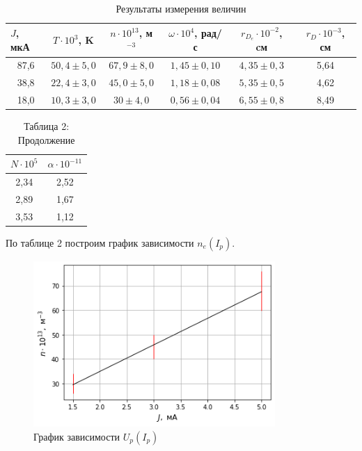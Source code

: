 \documentclass[a4paper]{article}
\theoremstyle{definition}
\theoremstyle{remark}
\begin{document}
        \begin{table}[h!]
            \centering
            \caption{Результаты измерения величин}
            \begin{tabular}{|c|c|c|c|c|c|}
            \hline
            \multicolumn{1}{|l|}{$J$, мкА} & $T\cdot 10^3$, K & $n \cdot 10^13$, м$^{-3}$ & $\omega \cdot 10^4$, рад/с & $r_{D_{e}}\cdot 10^{-2}$, cм & $r_{D} \cdot 10^{-3}$, см \\ \hline
            87,6                           & $50,4 \pm 5,0$   & $67,9 \pm 8,0$            & $1,45 \pm 0,10$            & $4,35 \pm 0,3$               & 5,64                      \\ \hline
            38,8                           & $22,4 \pm 3,0$   & $45,0 \pm 5,0$            & $1,18 \pm 0,08$            & $5,35 \pm 0,5$               & 4,62                      \\ \hline
            18,0                           & $10,3 \pm 3,0$   & $30 \pm 4,0$              & $0,56 \pm 0,04$            & $6,55 \pm 0,8$               & 8,49                      \\ \hline
            \end{tabular}
            \end{table}

            \newpage

            \begin{table}[t!]
                \centering
                \caption*{Таблица 2: Продолжение}
                \begin{tabular}{|c|c|}
                \hline
                $N \cdot 10^5$ & $\alpha \cdot 10^{-11}$ \\ \hline
                2,34           & 2,52                    \\ \hline
                2,89           & 1,67                    \\ \hline
                3,53           & 1,12                    \\ \hline
                \end{tabular}
                \end{table}

            По таблице 2 построим график зависимости $n_e(I_p)$.

            \begin{figure}[h!]
                \centering
                \includegraphics[width = 260pt]{image/graphlast.png}
                \caption{График зависимости $U_p(I_p)$}
            \end{figure}
\end{document}
